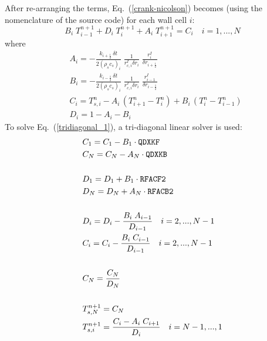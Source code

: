 After re-arranging the terms, Eq.~(\ref{crank-nicolson}) becomes (using the nomenclature of the source code) for each wall cell $i$:
 \begin{equation}
\label{tridiagonal_1}
  B_i \; T_{i-1}^{n+1} + D_i \; T_{i}^{n+1} + A_i \; T_{i+1}^{n+1} = C_i \quad i=1,...,N
\end{equation}
where
\begin{equation}
\label{tridiagonal_2}
\begin{split}
& A_i = -\frac{k_{i+\frac{1}{2}} \, \delta t}{2(\rho_s c_s)_i} \; \frac{1}{r_{c,i}^I \delta r_i} \; \frac{r_{i}^I}{\delta r_{i+\frac{1}{2}}}  \\
& B_i = -\frac{k_{i-\frac{1}{2}} \, \delta t}{2(\rho_s c_s)_i} \; \frac{1}{r_{c,i}^I \delta r_i} \; \frac{r_{i-1}^I}{\delta r_{i-\frac{1}{2}}}   \\
& C_i = T_{s,i}^{n}-A_i \, (T_{i+1}^n-T_i^n) + B_i \, (T_{i}^n-T_{i-1}^n)  \\
& D_i = 1-A_i-B_i
\end{split}
\end{equation}
To solve Eq.~(\ref{tridiagonal_1}), a tri-diagonal linear solver is used:
\begin{equation}
\begin{split}
& C_1 = C_1 - B_1 \cdot {\tt\small QDXKF} \\
& C_N = C_N - A_N \cdot {\tt\small QDXKB} \\
& \\
& D_1 = D_1 + B_1 \cdot {\tt\small RFACF2} \\
& D_N = D_N + A_N \cdot {\tt\small RFACB2} \\
& \\
& D_i = D_i - \frac{B_i \; A_{i-1}}{D_{i-1}} \quad i = 2, ..., N-1 \\
& C_i = C_i - \frac{B_i \; C_{i-1}}{D_{i-1}} \quad i = 2, ..., N-1\\
& \\
& C_N = \frac{C_N}{D_N} \\
& \\
& T^{n+1}_{s,N} = C_N \\
& T^{n+1}_{s,i} = \frac{C_i - A_i \; C_{i+1}}{D_i} \quad i = N-1,..., 1
\end{split}
\end{equation}
